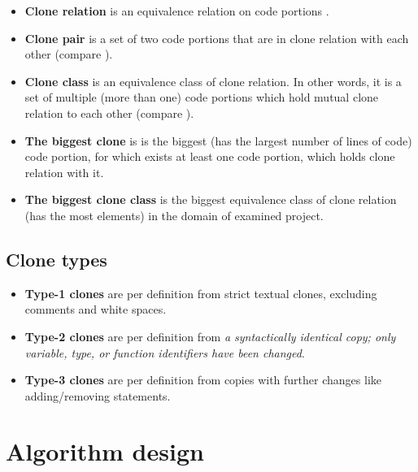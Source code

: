 \documentclass{uva-inf-article}
\begin{document}
\begin{itemize}

	\item{\textbf{Clone relation} is an equivalence relation on code portions \cite{kamiya2002ccfinder}.}
	
	\item{\textbf{Clone pair} is a set of two code portions that are in clone relation with each other (compare \cite{kamiya2002ccfinder}).}
	
	\item{\textbf{Clone class} is an equivalence class of clone relation. In other words, it is a set of multiple (more than one) code portions which hold mutual clone relation to each other (compare \cite{kamiya2002ccfinder}).}
	
	\item{\textbf{The biggest clone} is is the biggest (has the largest number of lines of code) code portion, for which exists at least one code portion, which holds clone relation with it.}
	
	\item{\textbf{The biggest clone class} is the biggest equivalence class of clone relation (has the most elements) in the domain of examined project.}
	
\end{itemize}	

\subsection{Clone types}

\begin{itemize}

	\item{\textbf{Type-1 clones}
are per definition from \cite{koschke2008identifying} strict textual clones, excluding comments and white spaces.}

	\item{\textbf{Type-2 clones}
are per definition from \cite{koschke2008identifying}  \textit{a syntactically identical copy; only variable, type, or function identifiers have been changed}.}

	\item{\textbf{Type-3 clones}
are per definition from \cite{koschke2008identifying} copies with further changes like adding/removing statements.}

\end{itemize}

\section{Algorithm design}
\end{document}
